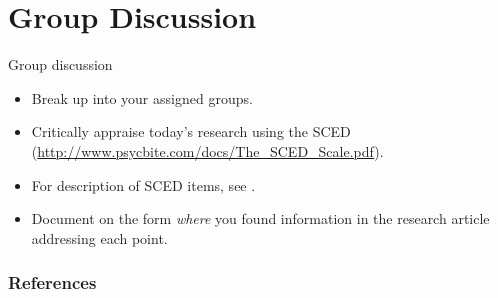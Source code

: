 \documentclass{beamer}
\begin{document}
\section*{Group Discussion}

% 
\begin{frame}{Group discussion}
	\begin{itemize}
	\item Break up into your assigned groups.
	\item Critically appraise today's research using the SCED (\url{http://www.psycbite.com/docs/The_SCED_Scale.pdf}).
	\item For description of SCED items, see \citet[pp. 400--401]{Tate2008}. 
	\item Document on the form \emph{where} you found information in the research article addressing each point.
	\end{itemize}
\end{frame}

\begin{frame}[shrink=15] %
	\frametitle{References}
	
	\small
 \end{frame}
\end{document}

